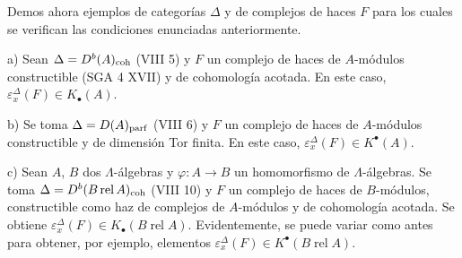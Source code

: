 Demos ahora ejemplos de categorías $\Delta$ y de complejos de haces $F$ para los cuales se verifican las condiciones enunciadas anteriormente.

a) Sean $\Delta=D^b(A)_{\mathrm{coh}}$ (VIII 5) y $F$ un complejo de haces de $A$-módulos constructible (SGA 4 XVII) y de cohomología acotada. En este caso, $\varepsilon_x^\Delta(F)\in K_\bullet(A)$.

b) Se toma $\Delta=D(A)_{\mathrm{parf}}$ (VIII 6) y $F$ un complejo de haces de $A$-módulos constructible y de dimensión Tor finita. En este caso, $\varepsilon_x^\Delta(F)\in K^{\bullet}(A)$.

c) Sean $A$, $B$ dos $\Lambda$-álgebras y $\varphi:A\to B$ un homomorfismo de $\Lambda$-álgebras. Se toma $\Delta=D^b(B\operatorname{ rel }A)_{\mathrm{coh}}$ (VIII 10) y $F$ un complejo de haces de $B$-módulos, constructible como haz de complejos de $A$-módulos y de cohomología acotada. Se obtiene $\varepsilon_x^\Delta(F)\in K_\bullet(B\operatorname{ rel }A)$. Evidentemente, se puede variar como antes para obtener, por ejemplo, elementos $\varepsilon_x^\Delta(F)\in K^{\bullet}(B\operatorname{ rel }A)$.
